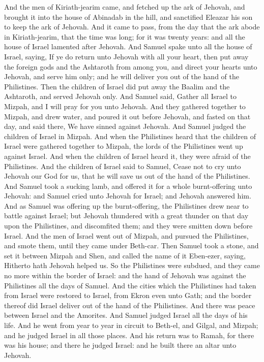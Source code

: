 And the men of Kiriath-jearim came, and fetched up the ark of Jehovah, and brought it into the house of Abinadab in the hill, and sanctified Eleazar his son to keep the ark of Jehovah. And it came to pass, from the day that the ark abode in Kiriath-jearim, that the time was long; for it was twenty years: and all the house of Israel lamented after Jehovah.  And Samuel spake unto all the house of Israel, saying, If ye do return unto Jehovah with all your heart, then put away the foreign gods and the Ashtaroth from among you, and direct your hearts unto Jehovah, and serve him only; and he will deliver you out of the hand of the Philistines. Then the children of Israel did put away the Baalim and the Ashtaroth, and served Jehovah only.  And Samuel said, Gather all Israel to Mizpah, and I will pray for you unto Jehovah. And they gathered together to Mizpah, and drew water, and poured it out before Jehovah, and fasted on that day, and said there, We have sinned against Jehovah. And Samuel judged the children of Israel in Mizpah. And when the Philistines heard that the children of Israel were gathered together to Mizpah, the lords of the Philistines went up against Israel. And when the children of Israel heard it, they were afraid of the Philistines. And the children of Israel said to Samuel, Cease not to cry unto Jehovah our God for us, that he will save us out of the hand of the Philistines. And Samuel took a sucking lamb, and offered it for a whole burnt-offering unto Jehovah: and Samuel cried unto Jehovah for Israel; and Jehovah answered him. And as Samuel was offering up the burnt-offering, the Philistines drew near to battle against Israel; but Jehovah thundered with a great thunder on that day upon the Philistines, and discomfited them; and they were smitten down before Israel. And the men of Israel went out of Mizpah, and pursued the Philistines, and smote them, until they came under Beth-car.  Then Samuel took a stone, and set it between Mizpah and Shen, and called the name of it Eben-ezer, saying, Hitherto hath Jehovah helped us. So the Philistines were subdued, and they came no more within the border of Israel: and the hand of Jehovah was against the Philistines all the days of Samuel. And the cities which the Philistines had taken from Israel were restored to Israel, from Ekron even unto Gath; and the border thereof did Israel deliver out of the hand of the Philistines. And there was peace between Israel and the Amorites.  And Samuel judged Israel all the days of his life. And he went from year to year in circuit to Beth-el, and Gilgal, and Mizpah; and he judged Israel in all those places. And his return was to Ramah, for there was his house; and there he judged Israel: and he built there an altar unto Jehovah. 

